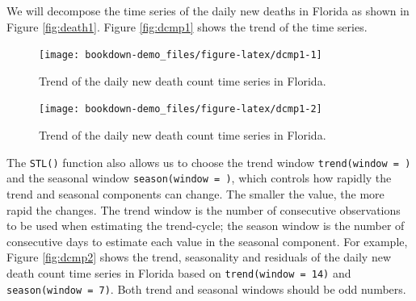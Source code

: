 \documentclass[]{book}
\newenvironment{Shaded}{\begin{snugshade}}{\end{snugshade}}
\newcommand{\KeywordTok}[1]{\textcolor[rgb]{0.13,0.29,0.53}{\textbf{#1}}}
\newcommand{\DataTypeTok}[1]{\textcolor[rgb]{0.13,0.29,0.53}{#1}}
\newcommand{\StringTok}[1]{\textcolor[rgb]{0.31,0.60,0.02}{#1}}
\newcommand{\OperatorTok}[1]{\textcolor[rgb]{0.81,0.36,0.00}{\textbf{#1}}}
\newcommand{\NormalTok}[1]{#1}
\begin{document}
We will decompose the time series of the daily new deaths in Florida as
shown in Figure \ref{fig:death1}. Figure \ref{fig:dcmp1} shows the trend
of the time series.

\begin{Shaded}
\end{Shaded}

\begin{figure}

{\centering \texttt{[image: bookdown-demo\_files/figure-latex/dcmp1-1]} 

}

\caption{Trend of the daily new death count time series in Florida.}\label{fig:dcmp1-1}
\end{figure}

\begin{Shaded}
\end{Shaded}

\begin{figure}

{\centering \texttt{[image: bookdown-demo\_files/figure-latex/dcmp1-2]} 

}

\caption{Trend of the daily new death count time series in Florida.}\label{fig:dcmp1-2}
\end{figure}

The \texttt{STL()} function also allows us to choose the trend window
\texttt{trend(window\ =\ )} and the seasonal window
\texttt{season(window\ =\ )}, which controls how rapidly the trend and
seasonal components can change. The smaller the value, the more rapid
the changes. The trend window is the number of consecutive observations
to be used when estimating the trend-cycle; the season window is the
number of consecutive days to estimate each value in the seasonal
component. For example, Figure \ref{fig:dcmp2} shows the trend,
seasonality and residuals of the daily new death count time series in
Florida based on \texttt{trend(window\ =\ 14)} and
\texttt{season(window\ =\ 7)}. Both trend and seasonal windows should be
odd numbers.
\end{document}
